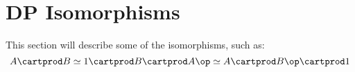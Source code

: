 

\section{DP Isomorphisms}

\begin{publictodo}
    This section will describe some of the isomorphisms, such as:
    \begin{equation}
        A \cartprod B \simeq 1 \cartprod B \cartprod A\op \simeq A \cartprod B\op \cartprod 1
    \end{equation}
\end{publictodo}

